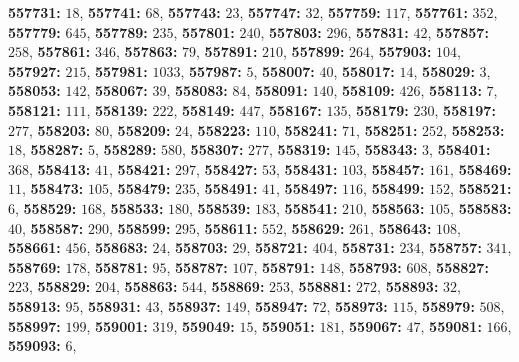 \textsf{\bfseries 557731:} $18$, \textsf{\bfseries 557741:} $68$, \textsf{\bfseries 557743:} $23$, \textsf{\bfseries 557747:} $32$, \textsf{\bfseries 557759:} $117$, \textsf{\bfseries 557761:} $352$, \textsf{\bfseries 557779:} $645$, \textsf{\bfseries 557789:} $235$, \textsf{\bfseries 557801:} $240$, \textsf{\bfseries 557803:} $296$, \textsf{\bfseries 557831:} $42$, \textsf{\bfseries 557857:} $258$, \textsf{\bfseries 557861:} $346$, \textsf{\bfseries 557863:} $79$, \textsf{\bfseries 557891:} $210$, \textsf{\bfseries 557899:} $264$, \textsf{\bfseries 557903:} $104$, \textsf{\bfseries 557927:} $215$, \textsf{\bfseries 557981:} $1033$, \textsf{\bfseries 557987:} $5$, \textsf{\bfseries 558007:} $40$, \textsf{\bfseries 558017:} $14$, \textsf{\bfseries 558029:} $3$, \textsf{\bfseries 558053:} $142$, \textsf{\bfseries 558067:} $39$, \textsf{\bfseries 558083:} $84$, \textsf{\bfseries 558091:} $140$, \textsf{\bfseries 558109:} $426$, \textsf{\bfseries 558113:} $7$, \textsf{\bfseries 558121:} $111$, \textsf{\bfseries 558139:} $222$, \textsf{\bfseries 558149:} $447$, \textsf{\bfseries 558167:} $135$, \textsf{\bfseries 558179:} $230$, \textsf{\bfseries 558197:} $277$, \textsf{\bfseries 558203:} $80$, \textsf{\bfseries 558209:} $24$, \textsf{\bfseries 558223:} $110$, \textsf{\bfseries 558241:} $71$, \textsf{\bfseries 558251:} $252$, \textsf{\bfseries 558253:} $18$, \textsf{\bfseries 558287:} $5$, \textsf{\bfseries 558289:} $580$, \textsf{\bfseries 558307:} $277$, \textsf{\bfseries 558319:} $145$, \textsf{\bfseries 558343:} $3$, \textsf{\bfseries 558401:} $368$, \textsf{\bfseries 558413:} $41$, \textsf{\bfseries 558421:} $297$, \textsf{\bfseries 558427:} $53$, \textsf{\bfseries 558431:} $103$, \textsf{\bfseries 558457:} $161$, \textsf{\bfseries 558469:} $11$, \textsf{\bfseries 558473:} $105$, \textsf{\bfseries 558479:} $235$, \textsf{\bfseries 558491:} $41$, \textsf{\bfseries 558497:} $116$, \textsf{\bfseries 558499:} $152$, \textsf{\bfseries 558521:} $6$, \textsf{\bfseries 558529:} $168$, \textsf{\bfseries 558533:} $180$, \textsf{\bfseries 558539:} $183$, \textsf{\bfseries 558541:} $210$, \textsf{\bfseries 558563:} $105$, \textsf{\bfseries 558583:} $40$, \textsf{\bfseries 558587:} $290$, \textsf{\bfseries 558599:} $295$, \textsf{\bfseries 558611:} $552$, \textsf{\bfseries 558629:} $261$, \textsf{\bfseries 558643:} $108$, \textsf{\bfseries 558661:} $456$, \textsf{\bfseries 558683:} $24$, \textsf{\bfseries 558703:} $29$, \textsf{\bfseries 558721:} $404$, \textsf{\bfseries 558731:} $234$, \textsf{\bfseries 558757:} $341$, \textsf{\bfseries 558769:} $178$, \textsf{\bfseries 558781:} $95$, \textsf{\bfseries 558787:} $107$, \textsf{\bfseries 558791:} $148$, \textsf{\bfseries 558793:} $608$, \textsf{\bfseries 558827:} $223$, \textsf{\bfseries 558829:} $204$, \textsf{\bfseries 558863:} $544$, \textsf{\bfseries 558869:} $253$, \textsf{\bfseries 558881:} $272$, \textsf{\bfseries 558893:} $32$, \textsf{\bfseries 558913:} $95$, \textsf{\bfseries 558931:} $43$, \textsf{\bfseries 558937:} $149$, \textsf{\bfseries 558947:} $72$, \textsf{\bfseries 558973:} $115$, \textsf{\bfseries 558979:} $508$, \textsf{\bfseries 558997:} $199$, \textsf{\bfseries 559001:} $319$, \textsf{\bfseries 559049:} $15$, \textsf{\bfseries 559051:} $181$, \textsf{\bfseries 559067:} $47$, \textsf{\bfseries 559081:} $166$, \textsf{\bfseries 559093:} $6$, 

